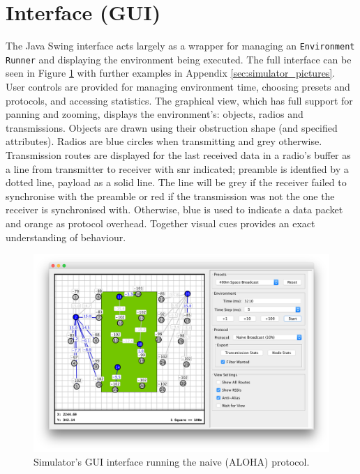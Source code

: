 \section{Interface (GUI)}
The Java Swing interface acts largely as a wrapper for managing an \texttt{Environment} \texttt{Runner} and displaying the environment being executed. The full interface can be seen in Figure \ref{fig:sim_interface_main} with further examples in Appendix \ref{sec:simulator_pictures}. User controls are provided for managing environment time, choosing presets and protocols, and accessing statistics. The graphical view, which has full support for panning and zooming, displays the environment's: objects, radios and transmissions. Objects are drawn using their obstruction shape (and specified attributes). Radios are blue circles when transmitting and grey otherwise. Transmission routes are displayed for the last received data in a radio's buffer as a line from transmitter to receiver with \ac{snr} indicated; preamble is identfied by a dotted line, payload as a solid line. The line will be grey if the receiver failed to synchronise with the preamble or red if the transmission was not the one the receiver is synchronised with. Otherwise, blue is used to indicate a data packet and orange as protocol overhead. Together visual cues provides an exact understanding of behaviour.

\begin{figure}[H]
    \centering
   	\includegraphics[width=\textwidth]{Figures/simulator_main}
    \caption[Simulator GUI example]{ 
    	Simulator's GUI interface running the naive (ALOHA) protocol.
    	}
    \label{fig:sim_interface_main}
\end{figure}





